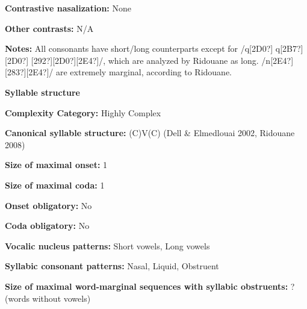 \begin{styleBody}
\textbf{Contrastive nasalization:} None
\end{styleBody}

\begin{styleBody}
\textbf{Other contrasts:} N/A
\end{styleBody}

\begin{styleBody}
\textbf{Notes:} All consonants have short/long counterparts except for /q[2D0?] q[2B7?][2D0?] [292?][2D0?][2E4?]/, which are analyzed by Ridouane as long. /n[2E4?] [283?][2E4?]/ are extremely marginal, according to Ridouane.
\end{styleBody}

\begin{styleBody}
\textbf{Syllable structure}
\end{styleBody}

\begin{styleBody}
\textbf{Complexity Category:} Highly Complex
\end{styleBody}

\begin{styleBody}
\textbf{Canonical syllable structure: }(C)V(C)\textbf{ }(Dell \& Elmedlouai 2002, Ridouane 2008)
\end{styleBody}

\begin{styleBody}
\textbf{Size of maximal onset:} 1
\end{styleBody}

\begin{styleBody}
\textbf{Size of maximal coda:} 1
\end{styleBody}

\begin{styleBody}
\textbf{Onset obligatory:} No
\end{styleBody}

\begin{styleBody}
\textbf{Coda obligatory:} No
\end{styleBody}

\begin{styleBody}
\textbf{Vocalic nucleus patterns:} Short vowels, Long vowels
\end{styleBody}

\begin{styleBody}
\textbf{Syllabic consonant patterns:} Nasal, Liquid, Obstruent
\end{styleBody}

\begin{styleBody}
\textbf{Size of maximal word{}-marginal sequences with syllabic obstruents:} ? (words without vowels)
\end{styleBody}

